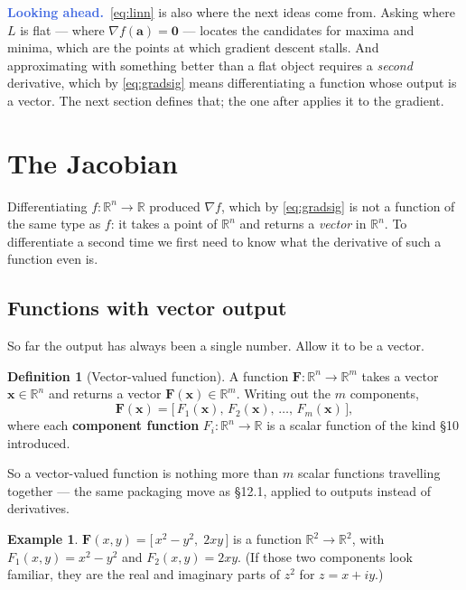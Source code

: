 \documentclass[11pt]{article}
\theoremstyle{plain}
\theoremstyle{definition}
\newtheorem{defn}{Definition}[section]
\newtheorem{ex}{Example}[section]
\theoremstyle{remark}
\newcommand{\lookahead}{\par\smallskip\noindent
  \textbf{\sffamily\textcolor{RoyalBlue}{Looking ahead.}}\ \ignorespaces}
\newcommand{\R}{\mathbb{R}}
\newcommand{\vc}[1]{\mathbf{#1}}
\newcommand{\grad}{\nabla}
\newcommand{\mt}[1]{\mathbf{#1}}          %
\begin{document}
\lookahead \eqref{eq:linn} is also where the next ideas come from. Asking where
$L$ is flat --- where $\grad f(\vc{a})=\vc{0}$ --- locates the candidates for
maxima and minima, which are the points at which gradient descent stalls. And
approximating with something better than a flat object requires a \emph{second}
derivative, which by \eqref{eq:gradsig} means differentiating a function whose
output is a vector. The next section defines that; the one after applies it to
the gradient.
\section{The Jacobian}
Differentiating $f:\R^{n}\to\R$ produced $\grad f$, which by \eqref{eq:gradsig}
is not a function of the same type as $f$: it takes a point of $\R^{n}$ and returns a \emph{vector}
in $\R^{n}$. To differentiate a second time we first need to know what the
derivative of such a function even is.

\subsection{Functions with vector output}
So far the output has always been a single number. Allow it to be a vector.

\begin{defn}[Vector-valued function]
A function $\mt{F}:\R^{n}\to\R^{m}$ takes a vector $\vc{x}\in\R^{n}$ and returns
a vector $\mt{F}(\vc{x})\in\R^{m}$. Writing out the $m$ components,
\[
  \mt{F}(\vc{x}) = \bigl[\,F_1(\vc{x}),\,F_2(\vc{x}),\,\dots,\,F_m(\vc{x})\,\bigr],
\]
where each \textbf{component function} $F_i:\R^{n}\to\R$ is a scalar function of
the kind \S10 introduced.
\end{defn}

\noindent So a vector-valued function is nothing more than $m$ scalar functions
travelling together --- the same packaging move as \S12.1, applied to outputs
instead of derivatives.

\begin{ex}
$\mt{F}(x,y)=\bigl[\,x^{2}-y^{2},\;2xy\,\bigr]$ is a function $\R^{2}\to\R^{2}$,
with $F_1(x,y)=x^{2}-y^{2}$ and $F_2(x,y)=2xy$. (If those two components look
familiar, they are the real and imaginary parts of $z^{2}$ for $z=x+iy$.)
\end{ex}
\end{document}

